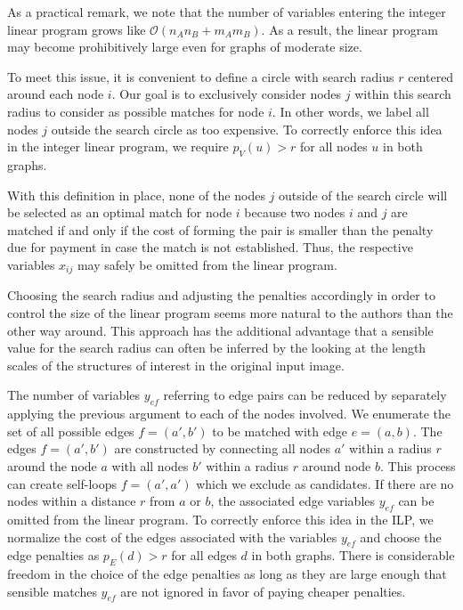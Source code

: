 		As a practical remark, we note that the number of variables entering the integer linear program grows like $\mathcal{O}(n_A n_B + m_A m_B)$. As a result, the linear program may become prohibitively large even for graphs of moderate size. 

		To meet this issue, it is convenient to define a circle with search radius $r$ centered around each node $i$. Our goal is to exclusively consider nodes $j$ within this search radius to consider as possible matches for node $i$. In other words, we label all nodes $j$ outside the search circle as too expensive. To correctly enforce this idea in the integer linear program, we require $p_V(u) > r$ for all nodes $u$ in both graphs. 

		With this definition in place, none of the nodes $j$ outside of the search circle will be selected as an optimal match for node $i$ because two nodes $i$ and $j$ are matched if and only if the cost of forming the pair is smaller than the penalty due for payment in case the match is not established. Thus, the respective variables $x_{ij}$ may safely be omitted from the linear program. 

		Choosing the search radius and adjusting the penalties accordingly in order to control the size of the linear program seems more natural to the authors than the other way around. This approach has the additional advantage that a sensible value for the search radius can often be inferred by the looking at the length scales of the structures of interest in the original input image.

		The number of variables $y_{ef}$ referring to edge pairs can be reduced by separately applying the previous argument to each of the nodes involved. We enumerate the set of all possible edges $f = (a',b')$ to be matched with edge $e = (a,b)$. The edges $f = (a',b')$ are constructed by connecting all nodes $a'$ within a radius $r$ around the node $a$ with all nodes $b'$ within a radius $r$ around node $b$. This process can create self-loops $f =(a',a')$ which we exclude as candidates. If there are no nodes within a distance $r$ from $a$ or $b$, the associated edge variables $y_{ef}$ can be omitted from the linear program. To correctly enforce this idea in the ILP, we normalize the cost of the edges associated with the variables $y_{ef}$ and choose the edge penalties as $p_E(d) > r $ for all edges $d$ in both graphs. There is considerable freedom in the choice of the edge penalties as long as they are large enough that sensible matches $y_{ef}$ are not ignored in favor of paying cheaper penalties. 

